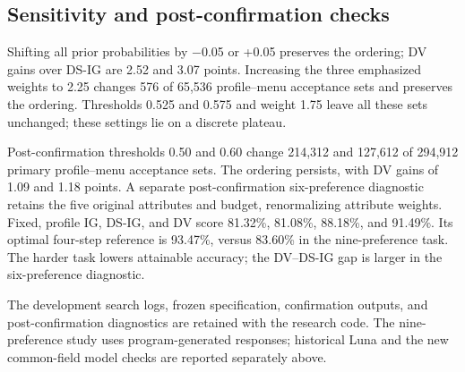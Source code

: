 \documentclass[sigconf,anonymous,review]{acmart}
\begin{document}
\subsection*{Sensitivity and post-confirmation checks}
Shifting all prior probabilities by $-$0.05 or +0.05 preserves the ordering; DV gains over DS-IG are 2.52 and 3.07 points. Increasing the three emphasized weights to 2.25 changes 576 of 65,536 profile--menu acceptance sets and preserves the ordering. Thresholds 0.525 and 0.575 and weight 1.75 leave all these sets unchanged; these settings lie on a discrete plateau.


Post-confirmation thresholds 0.50 and 0.60 change 214,312 and 127,612 of 294,912 primary profile--menu acceptance sets. The ordering persists, with DV gains of 1.09 and 1.18 points. A separate post-confirmation six-preference diagnostic retains the five original attributes and budget, renormalizing attribute weights. Fixed, profile IG, DS-IG, and DV score 81.32\%, 81.08\%, 88.18\%, and 91.49\%. Its optimal four-step reference is 93.47\%, versus 83.60\% in the nine-preference task. The harder task lowers attainable accuracy; the DV--DS-IG gap is larger in the six-preference diagnostic.


The development search logs, frozen specification, confirmation outputs, and post-confirmation diagnostics are retained with the research code. The nine-preference study uses program-generated responses; historical Luna and the new common-field model checks are reported separately above.
\fi
\end{document}
